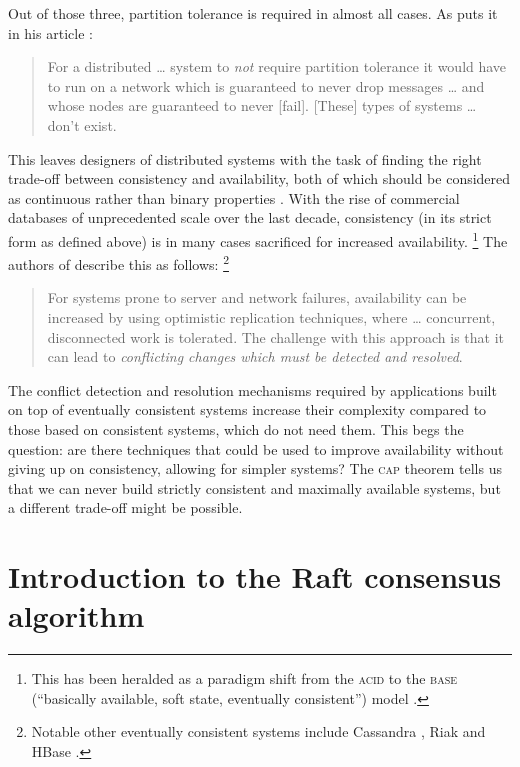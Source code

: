 \documentclass[12pt,chapterprefix=true,toc=bibliography,numbers=noendperiod,
               footnotes=multiple,twoside]{scrreprt}
\begin{document}
Out of those three, partition tolerance is required in almost all cases. As \citeauthor{needp} puts it in his article :

\begin{quote}
    For a distributed \dots{} system to \emph{not} require partition tolerance it would have to run on a network which is guaranteed to never drop messages \dots{} and whose nodes are guaranteed to never [fail]. [These] types of systems \dots{} don't exist.
\end{quote}

This leaves designers of distributed systems with the task of finding the right trade-off between consistency and availability, both of which should be considered as continuous rather than binary properties \autocite{cap12}. With the rise of commercial databases of unprecedented scale over the last decade, consistency (in its strict form as defined above) is in many cases sacrificed for increased availability.%
\footnote{This has been heralded as a paradigm shift from the \textsc{acid} to the \textsc{base} (\enquote{basically available, soft state, eventually consistent}) model \parencite{base}.} %
The authors of  describe this as follows:%
\footnote{Notable other eventually consistent systems include Cassandra , Riak  and HBase .}

\begin{quote}
    For systems prone to server and network failures, availability can be increased by using optimistic replication techniques, where \ldots{} concurrent, disconnected work is tolerated. The challenge with this approach is that it can lead to \emph{conflicting changes which must be detected and resolved}.
\end{quote}

The conflict detection and resolution mechanisms required by applications built on top of eventually consistent systems increase their complexity compared to those based on consistent systems, which do not need them. This begs the question: are there techniques that could be used to improve availability without giving up on consistency, allowing for simpler systems? The \textsc{cap} theorem tells us that we can never build strictly consistent and maximally available systems, but a different trade-off might be possible.

\section{Introduction to the Raft consensus algorithm}
\label{ssc:raft-consensus-algorithm}
\end{document}
